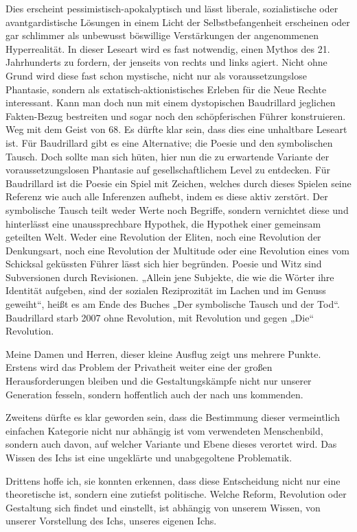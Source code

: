 \documentclass[a4paper,11pt]{article}
\begin{document}
Dies erscheint pessimistisch-apokalyptisch und lässt liberale, sozialistische oder avantgardistische Lösungen in einem Licht der Selbstbefangenheit erscheinen oder gar schlimmer als unbewusst böswillige Verstärkungen der angenommenen Hyperrealität. In dieser Leseart wird es fast notwendig, einen Mythos des 21. Jahrhunderts zu fordern, der jenseits von rechts und links agiert. Nicht ohne Grund wird diese fast schon mystische, nicht nur als voraussetzungslose Phantasie, sondern als extatisch-aktionistisches Erleben für die Neue Rechte interessant. Kann man doch nun mit einem dystopischen Baudrillard jeglichen Fakten-Bezug bestreiten und sogar noch den schöpferischen Führer konstruieren. Weg mit dem Geist von 68.
Es dürfte klar sein, dass dies eine unhaltbare Leseart ist. Für Baudrillard
gibt es eine Alternative; die Poesie und den symbolischen Tausch. Doch sollte
man sich hüten, hier nun die zu erwartende Variante der voraussetzungslosen
Phantasie auf gesellschaftlichem Level zu entdecken. Für Baudrillard ist die
Poesie ein Spiel mit Zeichen, welches durch dieses Spielen seine Referenz wie
auch alle Inferenzen aufhebt, indem es diese aktiv zerstört. Der symbolische
Tausch teilt weder Werte noch Begriffe, sondern vernichtet diese und
hinterlässt eine unaussprechbare Hypothek, die Hypothek einer gemeinsam
geteilten Welt. Weder eine Revolution der Eliten, noch eine Revolution der
Denkungsart, noch eine Revolution der Multitude oder eine Revolution eines vom
Schicksal geküssten Führer lässt sich hier begründen. Poesie und Witz sind
Subversionen durch Revisionen. „Allein jene Subjekte, die wie die Wörter ihre
Identität aufgeben, sind der sozialen Reziprozität im Lachen und im Genuss
geweiht“, heißt es am Ende des Buches „Der symbolische Tausch und der
Tod“. Baudrillard starb 2007 ohne Revolution, mit Revolution und gegen „Die“
Revolution.

Meine Damen und Herren, dieser kleine Ausflug zeigt uns mehrere Punkte.
Erstens wird das Problem der Privatheit weiter eine der großen
Herausforderungen bleiben und die Gestaltungskämpfe nicht nur unserer
Generation fesseln, sondern hoffentlich auch der nach uns kommenden.

Zweitens dürfte es klar geworden sein, dass die Bestimmung dieser vermeintlich
einfachen Kategorie nicht nur abhängig ist vom verwendeten Menschenbild,
sondern auch davon, auf welcher Variante und Ebene dieses verortet wird. Das
Wissen des Ichs ist eine ungeklärte und unabgegoltene Problematik.

Drittens hoffe ich, sie konnten erkennen, dass diese Entscheidung nicht nur
eine theoretische ist, sondern eine zutiefst politische. Welche Reform,
Revolution oder Gestaltung sich findet und einstellt, ist abhängig von unserem
Wissen, von unserer Vorstellung des Ichs, unseres eigenen Ichs.
\end{document}
